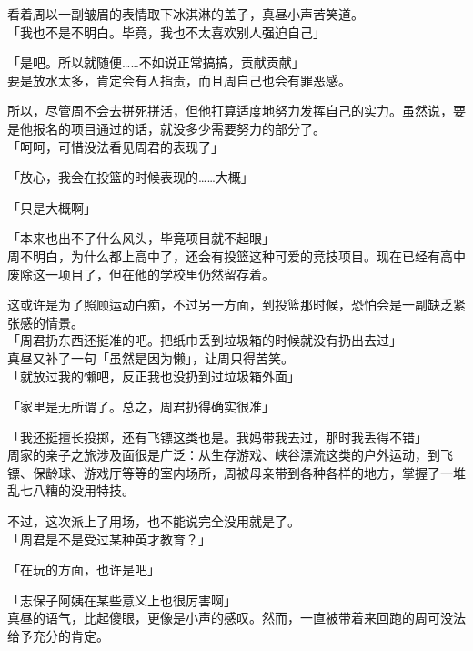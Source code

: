 看着周以一副皱眉的表情取下冰淇淋的盖子，真昼小声苦笑道。\\

「我也不是不明白。毕竟，我也不太喜欢别人强迫自己」

「是吧。所以就随便……不如说正常搞搞，贡献贡献」\\

要是放水太多，肯定会有人指责，而且周自己也会有罪恶感。

所以，尽管周不会去拼死拼活，但他打算适度地努力发挥自己的实力。虽然说，要是他报名的项目通过的话，就没多少需要努力的部分了。\\

「呵呵，可惜没法看见周君的表现了」

「放心，我会在投篮的时候表现的……大概」

「只是大概啊」

「本来也出不了什么风头，毕竟项目就不起眼」\\

周不明白，为什么都上高中了，还会有投篮这种可爱的竞技项目。现在已经有高中废除这一项目了，但在他的学校里仍然留存着。

这或许是为了照顾运动白痴，不过另一方面，到投篮那时候，恐怕会是一副缺乏紧张感的情景。\\

「周君扔东西还挺准的吧。把纸巾丢到垃圾箱的时候就没有扔出去过」\\

真昼又补了一句「虽然是因为懒」，让周只得苦笑。\\

「就放过我的懒吧，反正我也没扔到过垃圾箱外面」

「家里是无所谓了。总之，周君扔得确实很准」

「我还挺擅长投掷，还有飞镖这类也是。我妈带我去过，那时我丢得不错」\\

周家的亲子之旅涉及面很是广泛：从生存游戏、峡谷漂流这类的户外运动，到飞镖、保龄球、游戏厅等等的室内场所，周被母亲带到各种各样的地方，掌握了一堆乱七八糟的没用特技。

不过，这次派上了用场，也不能说完全没用就是了。\\

「周君是不是受过某种英才教育？」

「在玩的方面，也许是吧」

「志保子阿姨在某些意义上也很厉害啊」\\

真昼的语气，比起傻眼，更像是小声的感叹。然而，一直被带着来回跑的周可没法给予充分的肯定。\\

